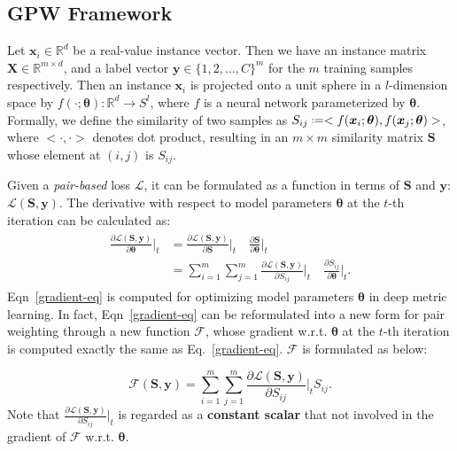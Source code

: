 \documentclass[10pt,twocolumn,letterpaper]{article}
\def\vtheta{{\bm{\theta}}}
\def\vx{{\bm{x}}}
\def\vy{{\bm{y}}}
\def\mS{{\bm{S}}}
\def\mX{{\bm{X}}}
\newcommand{\R}{\mathbb{R}}
\newcommand*{\defeq}{\mathrel{\vcenter{\baselineskip0.5ex \lineskiplimit0pt
			\hbox{\scriptsize.}\hbox{\scriptsize.}}}=}
\begin{document}
\subsection{GPW Framework}
\label{subsection-weighting}
 Let $\vx_i \in \R^d$ be a real-value instance vector. Then we have an instance matrix $\mX \in \R^{m\times d}$, and a label vector  $\vy \in \{1, 2, \dots, C \}^m$ for the $m$ training samples respectively.  Then an instance  $\vx_i$ is projected onto a unit sphere in a $l$-dimension space by $ f(\cdot ; \vtheta) : \R^{d} \rightarrow S^{l}$, where $f$ is a neural network parameterized by $\vtheta$.
Formally, we define the similarity of two samples as $S_{ij} \defeq   <f(\vx_i; \vtheta)  , f(\vx_j; \vtheta)>$, where $<\cdot , \cdot>$ denotes dot product, resulting in an $m\times m $ similarity matrix $\mS$ whose element at $(i,j)$ is $S_{ij}$.

Given a {\it pair-based} loss $\mathcal{L}$, it can be formulated as a function in terms of $\mS$ and $\vy$: $\mathcal{L}(\mS, \vy)$. The derivative with respect to model parameters $\vtheta$ at the $t$-th iteration can be calculated as: 
\begin{align}
\begin{split}
	\label{gradient-eq}
	\frac{\partial\mathcal{L}(\mS, \vy)}{\partial \vtheta} \bigg|_{t} &{}=
	\frac{\partial\mathcal{L}({\mS, \vy})}{\partial \mS} \bigg|_{t} \quad
	\frac{\partial{\mS}}{\partial \vtheta} \bigg|_{t} \\
	&{}=
	\sum_{i=1}^{m}  \sum_{j=1}^{m}\frac{\partial\mathcal{L} (\mS, \vy)}{\partial S_{ij}} \bigg|_{t}
	\quad
	\frac{\partial{S_{ij}}}{\partial \vtheta} \bigg|_{t} 	.
\end{split}
\end{align}
 Eqn~\ref{gradient-eq} is computed for optimizing model parameters $\vtheta$ in deep metric learning. In fact, Eqn~\ref{gradient-eq} can be reformulated into a new form for pair weighting through a new function $\mathcal{F}$, whose gradient w.r.t. $\vtheta$ at the $t$-th iteration is computed exactly the same as Eq.~\ref{gradient-eq}. $\mathcal{F}$ is formulated as below:
 
\begin{equation}
\label{weight0}
\mathcal{F}(\mS, \vy)= \sum_{i=1}^{m}  \sum_{j=1}^{m}\frac{
\partial\mathcal{L}(\mS, \vy)}{\partial S_{ij}} \bigg|_{t}  S_{ij}.
\end{equation}
Note that $\frac{\partial\mathcal{L}(\mS, \vy)}{\partial S_{ij}} \big|_{t}$  is regarded as a \textbf{constant scalar} that not involved in the gradient of $\mathcal{F}$ w.r.t. $\vtheta$.
\end{document}
